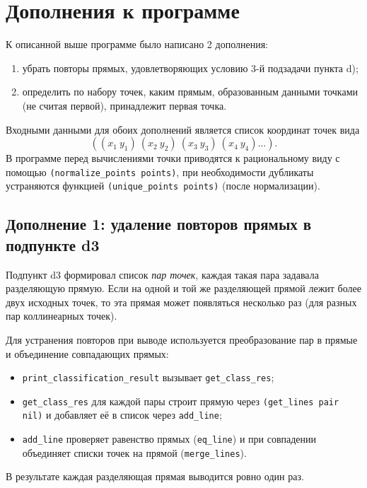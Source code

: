 \documentclass[a4paper, 11pt]{article}
\begin{document}
\newpage
\section{Дополнения к программе}
К описанной выше программе было написано 2 дополнения:
\begin{enumerate}
  \item убрать повторы прямых, удовлетворяющих условию 3-й подзадачи пункта d);
  \item определить по набору точек, каким прямым, образованным данными точками (не считая первой), принадлежит первая точка.
\end{enumerate}

Входными данными для обоих дополнений является список координат точек вида
\[
((x_1\ y_1)\ (x_2\ y_2)\ (x_3\ y_3)\ (x_4\ y_4)\dots).
\]
В программе перед вычислениями точки приводятся к рациональному виду с помощью
\texttt{(normalize\_points points)}, при необходимости дубликаты устраняются функцией
\texttt{(unique\_points points)} (после нормализации).

\subsection*{Дополнение 1: удаление повторов прямых в подпункте d3}
Подпункт d3 формировал список \emph{пар точек}, каждая такая пара задавала разделяющую прямую.
Если на одной и той же разделяющей прямой лежит более двух исходных точек, то эта прямая
может появляться несколько раз (для разных пар коллинеарных точек).

Для устранения повторов при выводе используется преобразование пар в прямые и объединение
совпадающих прямых:
\begin{itemize}
  \item \texttt{print\_classification\_result} вызывает \texttt{get\_class\_res};
  \item \texttt{get\_class\_res} для каждой пары строит прямую через \texttt{(get\_lines pair nil)}
        и добавляет её в список через \texttt{add\_line};
  \item \texttt{add\_line} проверяет равенство прямых (\texttt{eq\_line}) и при совпадении
        объединяет списки точек на прямой (\texttt{merge\_lines}).
\end{itemize}
В результате каждая разделяющая прямая выводится ровно один раз.
\end{document}
